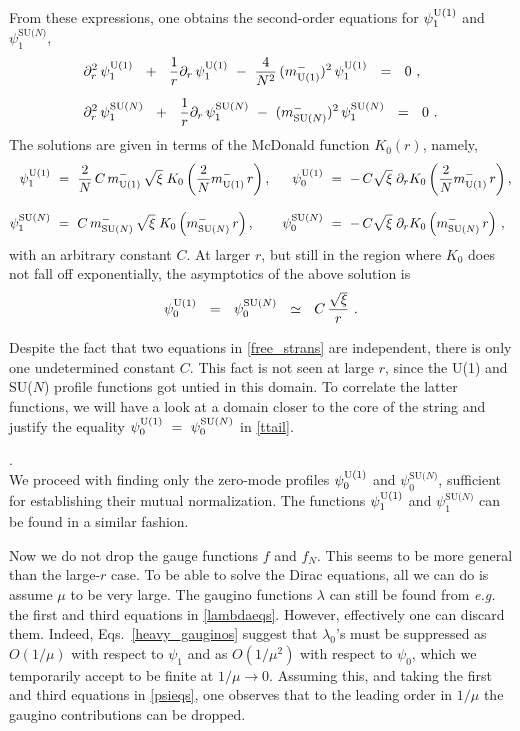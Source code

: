 \documentclass[12pt]{article}
\def\beq{\begin{equation}}
\def\eeq{\end{equation}}
\newcommand{\p}{\partial}
\newcommand{\mUm}{m_{\rm U(1)}^{-}}
\newcommand{\mNm}{m_\text{SU($N$)}^{-}}
\newcommand{\poU}{\psi_0^{\rm U(1)}}
\newcommand{\plU}{\psi_1^{\rm U(1)}}
\newcommand{\poN}{\psi_0^\text{SU($N$)}}
\newcommand{\plN}{\psi_1^\text{SU($N$)}}
\begin{document}
	From these expressions, one obtains the second-order equations for $ \plU $ and $ \plN $,
\begin{align}
%
\notag
	& \p_r^2\, \plU  ~~+~~ \frac{1}{r}\p_r\, \plU ~-~ \frac{4}{N^2}\,(\mUm)^2\, \plU  ~~=~~ 0~, 
	\\[2mm]
%
\label{free_strans}
	& \p_r^2\, \plN  ~~+~~ \frac{1}{r}\p_r\, \plN ~-~ (\mNm)^2\, \plN ~~=~~ 0~.
\end{align}
	The solutions are given in terms of  the McDonald function $ K_0(r) $, namely,
\begin{align*}
%
	\plU & ~=~ \frac{2}{N}\,C\,\mUm\,\sqrt{\xi}\;K_0\left(\frac{2}{N}\mUm\,r\right)  ,
&
	\poU & ~=~ -\,C\sqrt{\xi}\; \p_r K_0\left(\frac{2}{N}\mUm\,r\right),
\\[3mm]
%
	\plN & ~=~ C\,\mNm\,\sqrt{\xi}\; K_0\left(\mNm\, r\right),
&
	\poN & ~=~ -\,C\sqrt{\xi}\; \p_r K_0\left(\mNm\,r\right)\,,
\end{align*}
	with an arbitrary constant $ C $.
	At larger $ r $, but still in the region where $ K_0 $ does not fall off exponentially,
	the asymptotics of the above solution is
\beq
\label{ttail}
	\poU ~~=~~ \poN ~~\simeq~~ C\,\frac{\sqrt{\xi}}{r}~.
\eeq

	Despite the fact that two equations in \eqref{free_strans} are independent,
	there is only one undetermined constant $ C $.
	This fact is not seen at large $ r $, since the U(1) and SU($N$) profile functions got untied
	in this domain.
	To correlate the latter functions, we will have a look at a domain closer to the core of the string and
	justify the equality $ \poU ~=~ \poN $ in \eqref{ttail}.

	{.}\\[2mm]
We proceed with finding only the zero-mode profiles $ \poU $ and $ \poN $, 
sufficient for establishing
	their mutual normalization.
	The functions $ \plU $ and $ \plN $ can be found in a similar fashion. 

	Now we do not drop the gauge functions $ f $ and $ f_N$.
	This seems to be more general than the large-$ r $ case.
	To be able to solve the Dirac equations, all we can do is assume $ \mu $ to be very large.
	The gaugino functions $ \lambda $ can still be found from {\it e.g.} the first and 
	third equations in \eqref{lambdaeqs}.
	However, effectively one can discard them.
	Indeed, Eqs.~\eqref{heavy_gauginos} suggest that $ \lambda_0 $'s must be suppressed as $ O(1/\mu) $
	with respect to $ \psi_1 $ and as $ O(1/\mu^2) $ with respect to $ \psi_0 $, which we temporarily
	accept to be finite at $ 1/\mu \to 0 $.
	Assuming this, and taking the first and third equations in \eqref{psieqs}, one observes
	that to the leading order in $ 1/\mu $ the gaugino contributions can be dropped.
\end{document}
